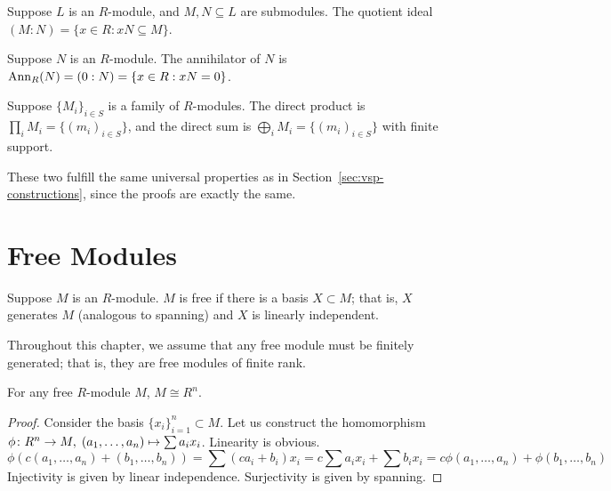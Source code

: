 \begin{definition}
    Suppose \(L\) is an \(R\)-module,
    and \(M,N \subseteq L\) are submodules.
    The quotient ideal \((M:N) = \{x \in R : xN \subseteq M\}\).
\end{definition}
\begin{definition}
    Suppose \(N\) is an \(R\)-module.
    The annihilator of \(N\) is \(\operatorname{Ann}_R(N) = (0:N) = \{x \in R : xN = 0\}\).
\end{definition}

\begin{definition}
    Suppose \({\{M_i\}}_{i \in S}\) is a family of \(R\)-modules.
    The direct product is \(\prod_i M_i = \{{(m_i)}_{i \in S}\}\),
    and the direct sum is \(\bigoplus_i M_i = \{{(m_i)}_{i \in S}\}\) with finite support.
\end{definition}
\begin{remark}
    These two fulfill the same universal properties as in Section~\ref{sec:vsp-constructions},
    since the proofs are exactly the same.
\end{remark}


\section{Free Modules}

\begin{definition}
    Suppose \(M\) is an \(R\)-module.
    \(M\) is free if there is a basis \(X \subset M\);
    that is, \(X\) generates \(M\) (analogous to spanning)
    and \(X\) is linearly independent.
\end{definition}
\begin{remark}
    Throughout this chapter,
    we assume that any free module must be finitely generated;
    that is, they are free modules of finite rank.
\end{remark}
\begin{lemma}
    For any free \(R\)-module \(M\), \(M \cong R^n\).
\end{lemma}
\begin{proof}
    Consider the basis \({\{x_i\}}_{i=1}^n \subset M\).
    Let us construct the homomorphism \(\phi\colon R^n\to M,\;(a_1,\hdots,a_n)\mapsto\sum a_i x_i\).
    Linearity is obvious.
    \begin{equation*}
        \phi(c(a_1,\hdots,a_n)+(b_1,\hdots,b_n))
        = \sum (ca_i + b_i)x_i
        = c \sum a_i x_i + \sum b_i x_i
        = c\phi(a_1,\hdots,a_n) + \phi(b_1,\hdots,b_n)
    \end{equation*}
    Injectivity is given by linear independence.
    Surjectivity is given by spanning.
\end{proof}

